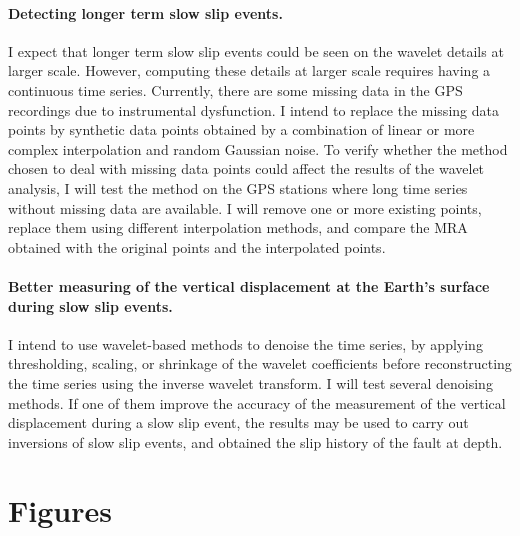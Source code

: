 \documentclass[letterpaper, 12pt]{article}
\begin{document}
\paragraph{Detecting longer term slow slip events.} I expect that longer term slow slip events could be seen on the wavelet details at larger scale. However, computing these details at larger scale requires having a continuous time series. Currently, there are some missing data in the GPS recordings due to instrumental dysfunction. I intend to replace the missing data points by synthetic data points obtained by a combination of linear or more complex interpolation and random Gaussian noise. To verify whether the method chosen to deal with missing data points could affect the results of the wavelet analysis, I will test the method on the GPS stations where long time series without missing data are available. I will remove one or more existing points, replace them using different interpolation methods, and compare the MRA obtained with the original points and the interpolated points.

\paragraph{Better measuring of the vertical displacement at the Earth's surface during slow slip events.}  I intend to use wavelet-based methods to denoise the time series, by applying thresholding, scaling, or shrinkage of the wavelet coefficients before reconstructing the time series using the inverse wavelet transform. I will test several denoising methods. If one of them improve the accuracy of the measurement of the vertical displacement during a slow slip event, the results may be used to carry out inversions of slow slip events, and obtained the slip history of the fault at depth. 

\newpage
\setcounter{page}{1}




\newpage
\setcounter{page}{1}

\section*{Figures}
\end{document}
